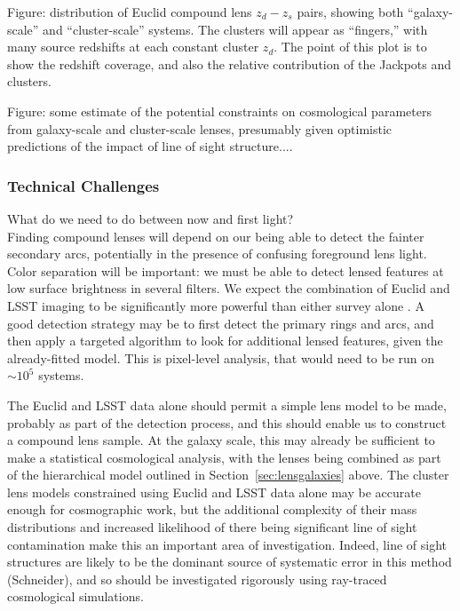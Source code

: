 \documentclass[twocolumn]{svjour3}
\begin{document}
Figure: distribution of Euclid compound lens $z_d - z_s$ pairs, showing
both ``galaxy-scale'' and ``cluster-scale'' systems. The clusters will
appear as ``fingers,'' with many source redshifts at each constant
cluster $z_d$. The point of this plot is to show the redshift coverage,
and also the relative contribution of the Jackpots and clusters.

Figure: some estimate of the potential constraints on cosmological
parameters from galaxy-scale and cluster-scale lenses, presumably given
optimistic predictions of the impact of line of sight structure....


\subsubsection{Technical Challenges}

What do we need to do between now and first light?\\

Finding compound lenses will depend on our being able to detect the
fainter secondary arcs, potentially in the presence of confusing
foreground lens light. Color separation will be important: we must be
able to detect lensed features at low surface brightness in several
filters. We expect the combination of Euclid and LSST imaging to be
significantly more powerful than either survey alone \citep{JainEtal2015}. 
A good detection
strategy may be to first detect the primary rings and arcs, and then
apply a targeted algorithm to look for additional lensed features, given
the already-fitted model. This is pixel-level analysis, that would need
to be run on $\sim 10^5$ systems.

The Euclid and LSST data alone should permit a simple lens model to be
made, probably as part of the detection process, and this should enable
us to construct a compound lens sample. At the galaxy scale, this may
already be sufficient to make a statistical cosmological analysis, with
the lenses being combined as part of the hierarchical model outlined in
Section~\ref{sec:lensgalaxies} above. The cluster lens models
constrained using Euclid and LSST data alone may be accurate enough for
cosmographic work, but the additional complexity of their mass
distributions and increased likelihood of there being significant line
of sight contamination make this an important area of investigation.
Indeed, line of sight structures are likely to be the dominant source of
systematic error in this method (Schneider), and so should be
investigated rigorously using ray-traced cosmological simulations.
\end{document}

